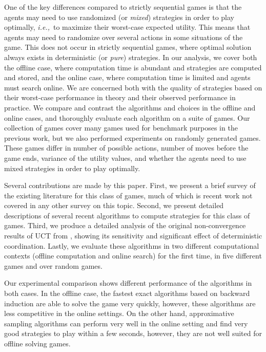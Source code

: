 \documentclass[preprint,12pt]{elsarticle}
\newcommand{\ie}{{\it i.e.,}~}
\begin{document}
One of the key differences compared to strictly sequential 
games is that the agents may need to use randomized (or \textit{mixed}) strategies in order to play optimally, 
\ie to maximize their worst-case expected utility.
This means that agents may need to randomize over several actions in some situations of the game. 
This does not occur in strictly sequential games, where optimal solution always exists in deterministic 
(or \textit{pure}) strategies.
In our analysis, we cover both the offline case, where computation time is 
abundant and strategies are computed and stored, and the online case, where computation time is limited and 
agents must search online. We are concerned both with the quality of strategies based on 
their worst-case performance in theory and their observed performance in practice. We compare and 
contrast the algorithms and choices in the offline and online cases, and thoroughly evaluate each 
algorithm on a suite of games. Our collection of games cover many games used for benchmark purposes
in the previous work, but we also performed experiments on randomly generated games. These games differ 
in number of possible actions, number of moves before the game ends, variance of the utility values,
and whether the agents need to use mixed strategies in order to play optimally.

Several contributions are made by this paper. First, we present a brief survey of the existing literature 
for this class of games, much of which is recent work not covered in any other survey on this topic. 
Second, we present detailed descriptions of several recent algorithms to compute strategies for this class of games. 
Third, we produce a detailed analysis of the original non-convergence results of UCT from \cite{Shafiei09}, 
showing its sensitivity and significant effect of deterministic coordination. 
Lastly, we evaluate these algorithms in two different computational contexts (offline computation and online search) for 
the first time, in five different games and over random games. 

Our experimental comparison shows different performance of the algorithms in both cases.
In the offline case, the fastest exact algorithms based on backward induction are able to solve the game 
very quickly, however, these algorithms are less competitive in the online settings. 
On the other hand, approximative sampling algorithms can perform very well in the online setting and 
find very good strategies to play within a few seconds, however, they are not well suited for offline solving games. 
\end{document}
